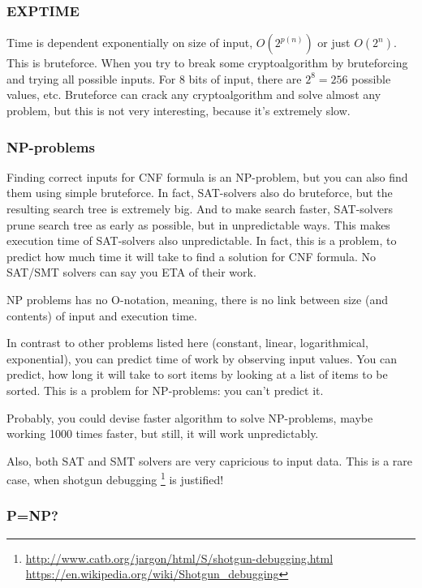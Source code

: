 \subsubsection{EXPTIME}

Time is dependent exponentially on size of input, $O(2^{p(n)})$ or just $O(2^n)$.
This is bruteforce.
When you try to break some cryptoalgorithm by bruteforcing and trying all possible inputs.
For 8 bits of input, there are $2^8=256$ possible values, etc.
Bruteforce can crack any cryptoalgorithm and solve almost any problem, but this is not very interesting, because it's extremely slow.

\subsubsection{NP-problems}

Finding correct inputs for CNF formula is an NP-problem, but you can also find them using simple bruteforce.
In fact, SAT-solvers also do bruteforce, but the resulting search tree is extremely big.
And to make search faster, SAT-solvers prune search tree as early as possible, but in unpredictable ways.
This makes execution time of SAT-solvers also unpredictable.
In fact, this is a problem, to predict how much time it will take to find a solution for CNF formula.
No SAT/SMT solvers can say you \ac{ETA} of their work.

NP problems has no O-notation, meaning, there is no link between size (and contents) of input and execution time.

In contrast to other problems listed here (constant, linear, logarithmical, exponential), you can predict time of work by observing
input values.
You can predict, how long it will take to sort items by looking at a list of items to be sorted.
This is a problem for NP-problems: you can't predict it.

Probably, you could devise faster algorithm to solve NP-problems, maybe working 1000 times faster, but still, it will work unpredictably.

Also, both SAT and SMT solvers are very capricious to input data.
This is a rare case, when shotgun debugging
\footnote{\url{http://www.catb.org/jargon/html/S/shotgun-debugging.html} \url{https://en.wikipedia.org/wiki/Shotgun_debugging}}
is justified!

\subsubsection{P=NP?}

